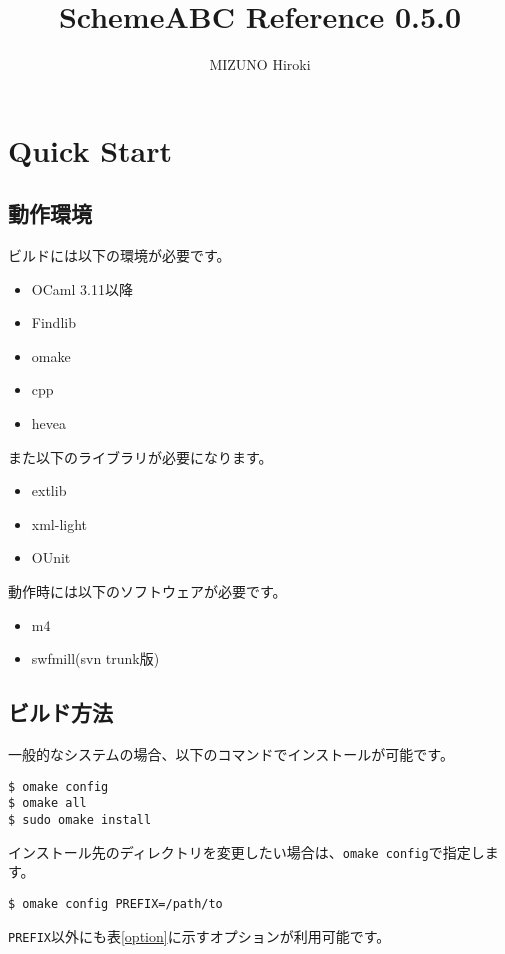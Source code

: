 \documentclass{article}
\begin{document}
\title{SchemeABC Reference 0.5.0}
\author{MIZUNO Hiroki}
\maketitle
\tableofcontents

\section{Quick Start}
\subsection{動作環境}

ビルドには以下の環境が必要です。
\begin{itemize}
\item OCaml 3.11以降
\item Findlib
\item omake
\item cpp
\item hevea
\end{itemize}

また以下のライブラリが必要になります。
\begin{itemize}
\item extlib
\item xml-light
\item OUnit
\end{itemize}

動作時には以下のソフトウェアが必要です。
\begin{itemize}
\item m4
\item swfmill(svn trunk版)
\end{itemize}

\subsection{ビルド方法}
一般的なシステムの場合、以下のコマンドでインストールが可能です。
\begin{verbatim}
$ omake config
$ omake all
$ sudo omake install
\end{verbatim}

インストール先のディレクトリを変更したい場合は、\verb!omake config!で指定します。

\begin{verbatim}
$ omake config PREFIX=/path/to
\end{verbatim}

\verb!PREFIX!以外にも表\ref{option}に示すオプションが利用可能です。
\end{document}

